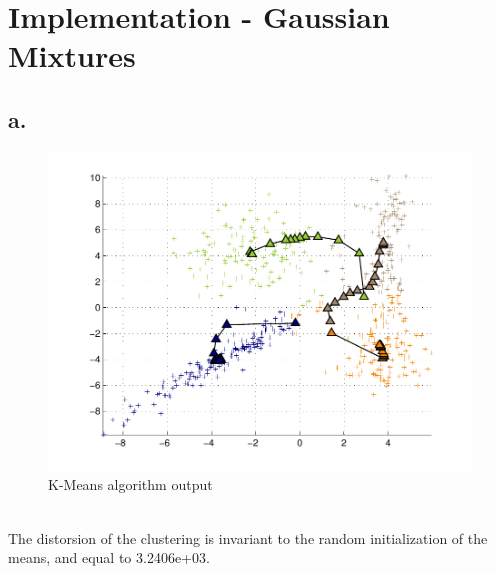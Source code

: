 \documentclass[12pt]{article}
\begin{document}
\section*{Implementation - Gaussian Mixtures}
\subsection*{a.}
\begin{figure}[h!]
	\centering 
	\includegraphics[width=.8\textwidth]{./pics/3a.pdf}
	\caption{K-Means algorithm output}
	\label{fig:3a}
\end{figure}
~\\
The distorsion of the clustering is invariant to the random initialization of the means, and equal to  3.2406e+03.~\\
\end{document}
